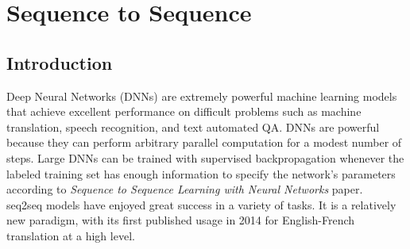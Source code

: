 \section{Sequence to Sequence}
\label{chap:Sequence to Sequence}

\subsection{Introduction}
Deep Neural Networks (DNNs) are extremely powerful machine learning models that achieve excellent performance on difficult problems such as machine translation, speech recognition, and text automated QA. DNNs are powerful because they can perform arbitrary parallel computation
for a modest number of steps. Large
DNNs can be trained with supervised backpropagation whenever the labeled training set has enough information to specify the network’s parameters according to \textit{Sequence to Sequence Learning
with Neural Networks} paper. \cite{web015}\\
seq2seq models have enjoyed great success in a variety of tasks.
It is a relatively new paradigm,
with its first published usage in 2014 for English-French translation at a high level.
